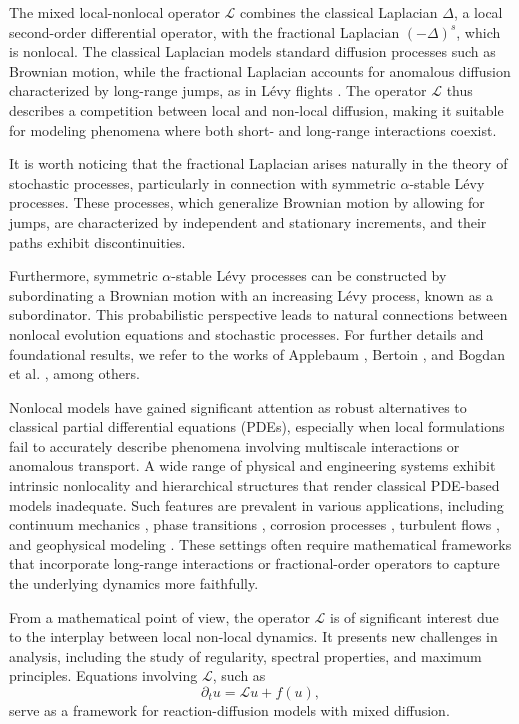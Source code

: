 \documentclass[12pt,reqno]{amsart}
\theoremstyle{plain}
\theoremstyle{definition}
\theoremstyle{remark}
\numberwithin{equation}{section}
\newcommand{\sL}{\mathscr{L}}
\begin{document}
The mixed local-nonlocal operator $\sL$ combines the classical Laplacian $ \Delta $, a local second-order differential operator, with the fractional Laplacian $ (-\Delta)^s $, which is nonlocal. The classical Laplacian models standard diffusion processes such as Brownian motion, while the fractional Laplacian accounts for anomalous diffusion characterized by long-range jumps, as in Lévy flights \cite{Dipierro1, Vald}. The operator $ \sL $ thus describes a competition between local and non-local diffusion, making it suitable for modeling phenomena where both short- and long-range interactions coexist.

It is worth noticing that the fractional Laplacian  arises naturally in the theory of stochastic processes, particularly in connection with symmetric $\alpha$-stable Lévy processes. These processes, which generalize Brownian motion by allowing for jumps, are characterized by independent and stationary increments, and their paths exhibit discontinuities.

Furthermore, symmetric $\alpha$-stable Lévy processes can be constructed by subordinating a Brownian motion with an increasing Lévy process, known as a subordinator. This probabilistic perspective leads to natural connections between nonlocal evolution equations and stochastic processes. For further details and foundational results, we refer to the works of Applebaum \cite{Applebaum}, Bertoin \cite{Bertoin}, and Bogdan et al. \cite{Bogdan}, among others.

Nonlocal models have gained significant attention as robust alternatives to classical partial differential equations (PDEs), especially when local formulations fail to accurately describe phenomena involving multiscale interactions or anomalous transport. A wide range of physical and engineering systems exhibit intrinsic nonlocality and hierarchical structures that render classical PDE-based models inadequate. Such features are prevalent in various applications, including continuum mechanics \cite{Mec1, Mec2, Mec3},  phase transitions \cite{Ph1, Ph2, Ph3}, corrosion processes \cite{Cor}, turbulent flows \cite{Turb1, Turb2, Turb3}, and geophysical modeling \cite{Geo1, Geo2, Geo3, Geo4, Geo5}. These settings often require mathematical frameworks that incorporate long-range interactions or fractional-order operators to capture the underlying dynamics more faithfully.

From a mathematical point of view, the operator $ \sL $ is of significant interest due to the interplay between local non-local dynamics. It presents new challenges in analysis, including the study of regularity, spectral properties, and maximum principles. Equations involving $ \sL $, such as
\begin{equation}
    \label{L-f-u}
    \partial_t u = \mathscr{L} u + f(u),
\end{equation}
serve as a framework for reaction-diffusion models with mixed diffusion. 
\end{document}
